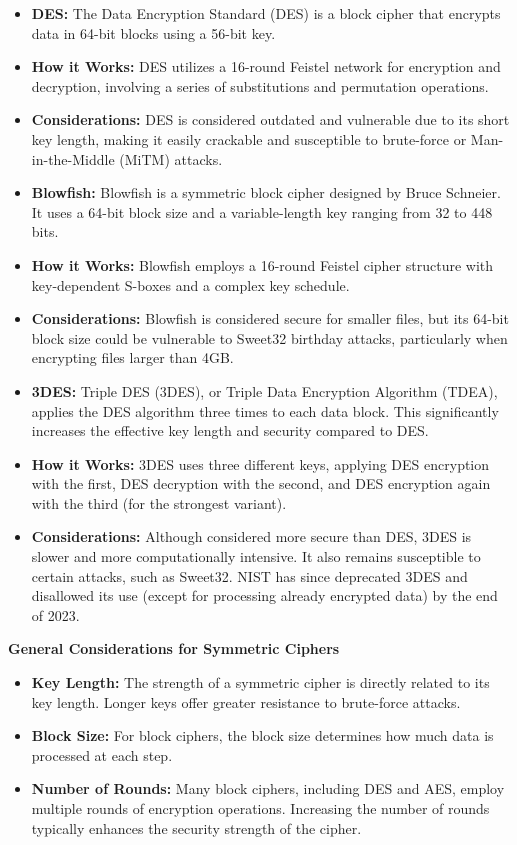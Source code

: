 \begin{itemize}
    \item \textbf{DES:} The Data Encryption Standard (DES) is a block cipher that encrypts data in 64-bit blocks using a 56-bit key.
        \item \textbf{How it Works:} DES utilizes a 16-round Feistel network for encryption and decryption, involving a series of substitutions and permutation operations.
        \item \textbf{Considerations:} DES is considered outdated and vulnerable due to its short key length, making it easily crackable and susceptible to brute-force or Man-in-the-Middle (MiTM) attacks.
    \item \textbf{Blowfish:} Blowfish is a symmetric block cipher designed by Bruce Schneier. It uses a 64-bit block size and a variable-length key ranging from 32 to 448 bits.
        \item \textbf{How it Works:} Blowfish employs a 16-round Feistel cipher structure with key-dependent S-boxes and a complex key schedule.
        \item \textbf{Considerations:} Blowfish is considered secure for smaller files, but its 64-bit block size could be vulnerable to Sweet32 birthday attacks, particularly when encrypting files larger than 4GB.
    \item \textbf{3DES:} Triple DES (3DES), or Triple Data Encryption Algorithm (TDEA), applies the DES algorithm three times to each data block. This significantly increases the effective key length and security compared to DES.
        \item \textbf{How it Works:} 3DES uses three different keys, applying DES encryption with the first, DES decryption with the second, and DES encryption again with the third (for the strongest variant).
        \item \textbf{Considerations:} Although considered more secure than DES, 3DES is slower and more computationally intensive. It also remains susceptible to certain attacks, such as Sweet32. NIST has since deprecated 3DES and disallowed its use (except for processing already encrypted data) by the end of 2023.
\end{itemize}
\textbf{General Considerations for Symmetric Ciphers}
\begin{itemize}
    \item \textbf{Key Length:} The strength of a symmetric cipher is directly related to its key length. Longer keys offer greater resistance to brute-force attacks.
    \item \textbf{Block Size:} For block ciphers, the block size determines how much data is processed at each step.
    \item \textbf{Number of Rounds:} Many block ciphers, including DES and AES, employ multiple rounds of encryption operations. Increasing the number of rounds typically enhances the security strength of the cipher.
\end{itemize}
